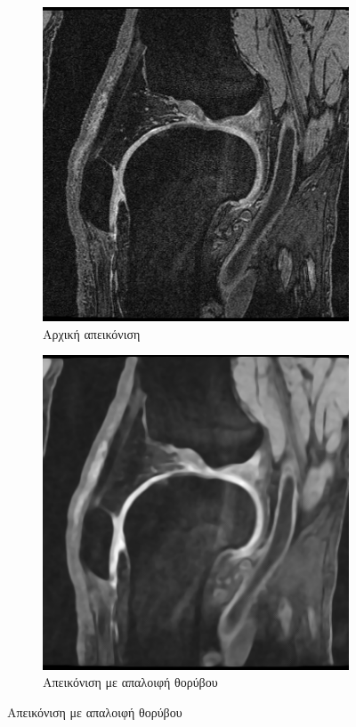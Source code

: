 \documentclass[a4paper,12pt]{article}
\begin{document}
\begin{figure}[H]
    \centering

    \begin{subfigure}[t]{0.4\linewidth}
    \includegraphics[width=\linewidth]{original_1.png}
    \caption{Αρχική απεικόνιση}
    \end{subfigure}
    \begin{subfigure}[t]{0.4\linewidth}
    \includegraphics[width=\linewidth]{curvature_1.png}
    \caption{Απεικόνιση με απαλοιφή θορύβου}
    \end{subfigure}


\end{figure}
\end{document}
